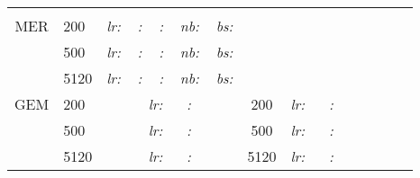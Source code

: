 \documentclass{article}
\begin{document}
\begin{table}[H]
\begin{tabular}{| Sl | Sc | Sl | Sc | Sl |}
        & & & & \\
MER     & 200    & \textit{lr:}    ~ \textit{:}  ~ \textit{:}  ~ \textit{nb:}  ~ \textit{bs:}  & & \\
        & 500    & \textit{lr:}   ~ \textit{:}  ~ \textit{:}  ~ \textit{nb:}  ~ \textit{bs:}  & & \\
        & 5120   & \textit{lr:}    ~ \textit{:}  ~ \textit{:}  ~ \textit{nb:}  ~ \textit{bs:}  & & \\
GEM     & 200    & \textit{lr:}   ~~  \textit{:}  & 200  &\textit{lr:}  ~~ \textit{:}  \\
        & 500    & \textit{lr:}   ~~  \textit{:}  & 500  &\textit{lr:}  ~~ \textit{:}  \\
        & 5120   & \textit{lr:}   ~~  \textit{:}  & 5120 &\textit{lr:}  ~~ \textit{:}  \\
\hline
\end{tabular}
\end{table}
\end{document}
